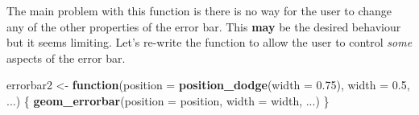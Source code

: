 \documentclass[]{book}
\newenvironment{Shaded}{\begin{snugshade}}{\end{snugshade}}
\newcommand{\ControlFlowTok}[1]{\textcolor[rgb]{0.13,0.29,0.53}{\textbf{#1}}}
\newcommand{\DataTypeTok}[1]{\textcolor[rgb]{0.13,0.29,0.53}{#1}}
\newcommand{\FloatTok}[1]{\textcolor[rgb]{0.00,0.00,0.81}{#1}}
\newcommand{\KeywordTok}[1]{\textcolor[rgb]{0.13,0.29,0.53}{\textbf{#1}}}
\newcommand{\NormalTok}[1]{#1}
\newcommand{\StringTok}[1]{\textcolor[rgb]{0.31,0.60,0.02}{#1}}
\theoremstyle{definition}
\theoremstyle{definition}
\theoremstyle{definition}
\theoremstyle{remark}
\begin{document}
The main problem with this function is there is no way for the user to
change any of the other properties of the error bar. This \textbf{may}
be the desired behaviour but it seems limiting. Let's re-write the
function to allow the user to control \emph{some} aspects of the error
bar.

\begin{Shaded}
\begin{Highlighting}[]
\NormalTok{errorbar2 <-}\StringTok{ }\ControlFlowTok{function}\NormalTok{(}\DataTypeTok{position =} \KeywordTok{position_dodge}\NormalTok{(}\DataTypeTok{width =} \FloatTok{0.75}\NormalTok{),}
                      \DataTypeTok{width =} \FloatTok{0.5}\NormalTok{, ...) \{}
  \KeywordTok{geom_errorbar}\NormalTok{(}\DataTypeTok{position =}\NormalTok{ position, }\DataTypeTok{width =}\NormalTok{ width, ...)}
\NormalTok{\}}
                    

\end{Highlighting}
\end{Shaded}
\end{document}
